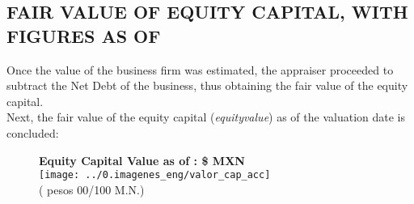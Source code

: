 
\subsection{FAIR VALUE OF EQUITY CAPITAL, WITH FIGURES AS OF \fechaValoresCorto}

Once the value of the business firm was estimated, the appraiser proceeded to subtract the Net Debt of the business, thus obtaining the fair value of the equity capital.\\

Next, the fair value of the equity capital (\textit{\gls{equityvalue}}) as of the valuation date is concluded:\\


\begin{figure}[H]
\centering
\textbf{\textcolor{principal}{Equity Capital Value as of \fechaValoresCorto:} \$\valorCapital{} MXN}\\
\texttt{[image: ../0.imagenes\_eng/valor\_cap\_acc]}\\
(\textcolor{principal}{\valorCapitalLetra{} pesos 00/100 M.N.})


\end{figure}
